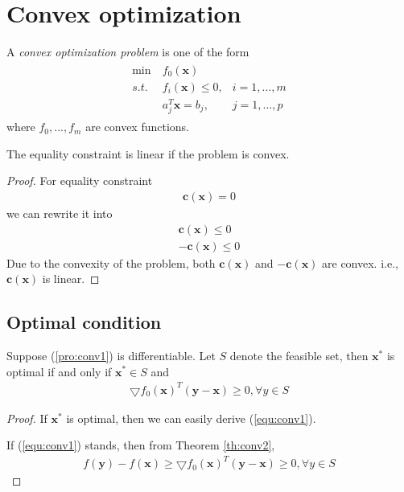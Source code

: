 \section{Convex optimization}
A \emph{convex optimization problem}
is one of the form
\begin{align}
    \begin{array}{lll}
        \min \ &f_0 (\mathbf{x}) \\
        s.t. \ &f_i (\mathbf{x}) \leq 0, &i = 1,..., m \\
        &a_j^T \mathbf{x} = b_j, &j = 1, ..., p
    \end{array}
    \label{pro:conv1}
\end{align} 
where $f_0,..., f_m$ are convex functions.
\begin{remark}
    The equality constraint is linear if the problem
    is convex.
\end{remark}
\begin{proof}
    For equality constraint
    \begin{align}
        \mathbf{c}(\mathbf{x}) = 0
    \end{align}
    we can rewrite it into
    \begin{align}
        \mathbf{c}(\mathbf{x}) \leq 0 \\
        -\mathbf{c}(\mathbf{x}) \leq 0
    \end{align}
    Due to the convexity of the problem,
    both $\mathbf{c}(\mathbf{x})$ and
    $-\mathbf{c}(\mathbf{x})$ are convex.
    i.e., $\mathbf{c}(\mathbf{x})$ is linear.
\end{proof}

\subsection{Optimal condition}

\begin{theorem}
Suppose (\ref{pro:conv1}) is differentiable.
Let $S$ denote the feasible set, then $\mathbf{x}^*$
is optimal if and only if $\mathbf{x}^* \in S$ and
\begin{align}
    \bigtriangledown f_0(\mathbf{x})^T (\mathbf{y}
    - \mathbf{x}) \geq 0, \forall y \in S
    \label{equ:conv1}
\end{align}
\label{th:conv1}
\end{theorem}
\begin{proof}
    If $\mathbf{x}^*$ is optimal, then
    we can easily derive (\ref{equ:conv1}).
    \par
    If (\ref{equ:conv1}) stands, then from
    Theorem \ref{th:conv2},
    \begin{align}
        f(\mathbf{y}) - f(\mathbf{x})
        \geq \bigtriangledown f_0(\mathbf{x})^T (\mathbf{y}
        - \mathbf{x}) \geq 0, \forall y \in S
    \end{align}
\end{proof}

